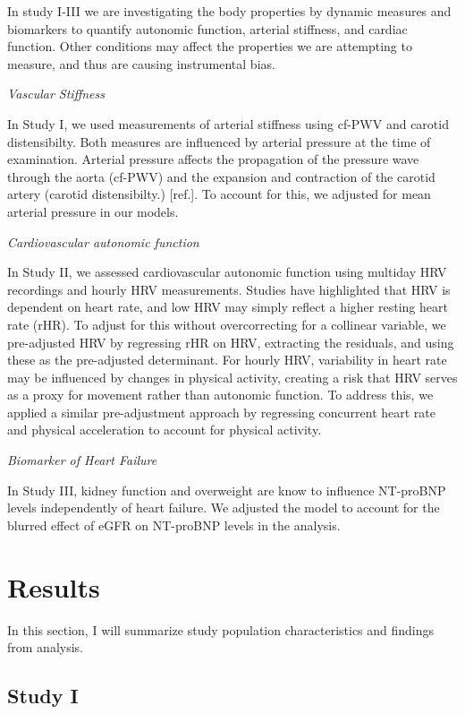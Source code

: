 \documentclass[
  a4paper,
  headsepline=true,
  open=any]{scrbook}
\begin{document}
In study I-III we are investigating the body properties by dynamic
measures and biomarkers to quantify autonomic function, arterial
stiffness, and cardiac function. Other conditions may affect the
properties we are attempting to measure, and thus are causing
instrumental bias.

\emph{Vascular Stiffness}

In Study I, we used measurements of arterial stiffness using cf-PWV and
carotid distensibilty. Both measures are influenced by arterial pressure
at the time of examination. Arterial pressure affects the propagation of
the pressure wave through the aorta (cf-PWV) and the expansion and
contraction of the carotid artery (carotid distensibilty.) {[}ref.{]}.
To account for this, we adjusted for mean arterial pressure in our
models.

\emph{Cardiovascular autonomic function}

In Study II, we assessed cardiovascular autonomic function using
multiday HRV recordings and hourly HRV measurements. Studies have
highlighted that HRV is dependent on heart rate, and low HRV may simply
reflect a higher resting heart rate (rHR). To adjust for this without
overcorrecting for a collinear variable, we pre-adjusted HRV by
regressing rHR on HRV, extracting the residuals, and using these as the
pre-adjusted determinant. For hourly HRV, variability in heart rate may
be influenced by changes in physical activity, creating a risk that HRV
serves as a proxy for movement rather than autonomic function. To
address this, we applied a similar pre-adjustment approach by regressing
concurrent heart rate and physical acceleration to account for physical
activity.

\emph{Biomarker of Heart Failure}

In Study III, kidney function and overweight are know to influence
NT-proBNP levels independently of heart failure. We adjusted the model
to account for the blurred effect of eGFR on NT-proBNP levels in the
analysis.


\hypertarget{results}{%
\chapter{Results}\label{results}}

In this section, I will summarize study population characteristics and
findings from analysis.

\hypertarget{study-i-1}{%
\section{Study I}\label{study-i-1}}
\end{document}
